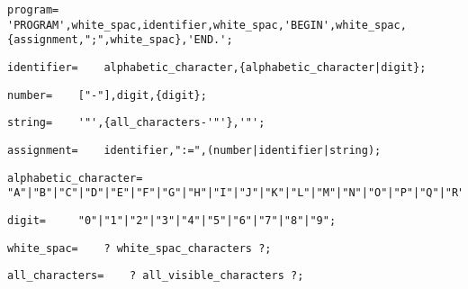 \documentclass{article}
\begin{document}
    \begin{lstlisting}[mathescape=true]
     program= 	'PROGRAM',white_spac,identifier,white_spac,'BEGIN',white_spac,{assignment,";",white_spac},'END.';
    \end{lstlisting}
    
    \begin{lstlisting}[mathescape=true]
     identifier= 	alphabetic_character,{alphabetic_character|digit};
    \end{lstlisting}
    
    \begin{lstlisting}[mathescape=true]
     number= 	["-"],digit,{digit};
    \end{lstlisting}
    
    \begin{lstlisting}[mathescape=true]
     string= 	'"',{all_characters-'"'},'"';
    \end{lstlisting}
    
    \begin{lstlisting}[mathescape=true]
     assignment= 	identifier,":=",(number|identifier|string);
    \end{lstlisting}
    
    \begin{lstlisting}[mathescape=true]
     alphabetic_character= 	"A"|"B"|"C"|"D"|"E"|"F"|"G"|"H"|"I"|"J"|"K"|"L"|"M"|"N"|"O"|"P"|"Q"|"R"|"S"|"T"|"U"|"V"|"W"|"X"|"Y"|"Z";
    \end{lstlisting}
    
    \begin{lstlisting}[mathescape=true]
     digit= 	"0"|"1"|"2"|"3"|"4"|"5"|"6"|"7"|"8"|"9";
    \end{lstlisting}
    
    \begin{lstlisting}[mathescape=true]
     white_spac= 	? white_spac_characters ?;
    \end{lstlisting}
    
    \begin{lstlisting}[mathescape=true]
     all_characters= 	? all_visible_characters ?;
    \end{lstlisting}
    
\end{document}
